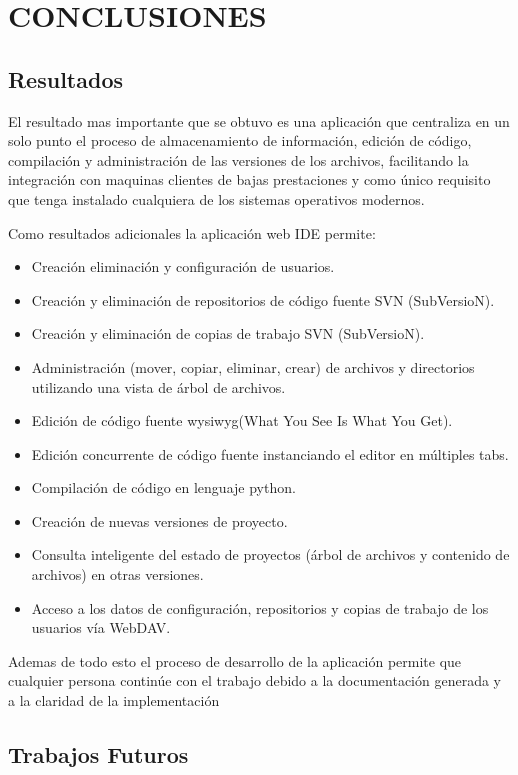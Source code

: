 \section{CONCLUSIONES}

\subsection{Resultados}

El resultado mas importante que se obtuvo es una aplicación que centraliza en un solo punto el proceso de almacenamiento de información, edición de código, compilación y administración de las versiones de los archivos, facilitando la integración con maquinas clientes de bajas prestaciones y como único requisito que tenga instalado cualquiera de los sistemas operativos modernos.

Como resultados adicionales la aplicación web IDE permite:

\begin{itemize}
	\item Creación eliminación y configuración de usuarios.
	\item Creación y eliminación de repositorios de código fuente SVN (SubVersioN).
	\item Creación y eliminación de copias de trabajo SVN (SubVersioN).
	\item Administración (mover, copiar, eliminar, crear) de archivos y directorios utilizando una vista de árbol de archivos.
	\item Edición de código fuente wysiwyg(What You See Is What You Get).
	\item Edición concurrente de código fuente instanciando el editor en múltiples tabs.
	\item Compilación de código en lenguaje python.
	\item Creación de nuevas versiones de proyecto.
	\item Consulta inteligente del estado de proyectos (árbol de archivos y contenido de archivos) en otras versiones.
	\item Acceso a los datos de configuración, repositorios y copias de trabajo de los usuarios vía WebDAV.
\end{itemize}

Ademas de todo esto el proceso de desarrollo de la aplicación permite que cualquier persona continúe con el trabajo debido a la documentación generada y a la claridad de la implementación


\subsection{Trabajos Futuros}

